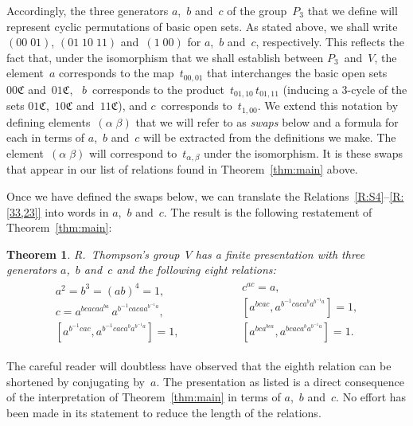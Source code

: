 \documentclass[a4paper,11pt]{article}
\numberwithin{equation}{section}
\newcommand{\C}{\mathfrak{C}}
\newcommand{\nbd}{\nobreakdash-}
\newcommand{\swap}[2]{(#1\;#2)}
\newtheorem{thm}{Theorem}[section]
\begin{document}
Accordingly, the three generators $a$,~$b$ and~$c$ of the
group~$P_{3}$ that we define will represent cyclic permutations of
basic open sets.  As stated above, we shall write $\swap{00}{01}$,
$(01 \; 10 \; 11)$ and~$\swap{1}{00}$ for $a$,~$b$ and~$c$,
respectively.  This reflects the fact that, under the isomorphism that
we shall establish between $P_{3}$~and~$V$, the element~$a$
corresponds to the map~$t_{00,01}$ that interchanges the basic open
sets $00\C$ and~$01\C$, \ $b$~corresponds to the product~$t_{01,10}\,
t_{01,11}$ (inducing a $3$\nbd cycle of the sets $01\C$,~$10\C$
and~$11\C$), and $c$~corresponds to~$t_{1,00}$.  We extend this
notation by defining elements~$\swap{\alpha}{\beta}$ that we will
refer to as \emph{swaps} below and a formula for each in terms of
$a$,~$b$ and~$c$ will be extracted from the definitions we make.  The
element~$\swap{\alpha}{\beta}$ will correspond to~$t_{\alpha,\beta}$
under the isomorphism.  It is these swaps that appear in our list of
relations found in Theorem~\ref{thm:main} above.

Once we have defined the swaps below, we can translate the
Relations~\ref{R:S4}--\ref{R:[33,23]} into words in $a$,~$b$ and~$c$.
The result is the following restatement of Theorem~\ref{thm:main}:

\begin{thm}
  \label{thm:mainWithWords}
  R.~Thompson's group~$V$ has a finite presentation with three
  generators $a$,~$b$ and~$c$ and the following eight relations:
\begin{equation}
  \begin{aligned}
    \begin{gathered}
      a^{2} = b^{3} = (ab)^{4} = 1, \\
      c = a^{bcacaa^{ba}} \, a^{b^{-1}cacaa^{b^{-1}a}}, \\
      [ a^{b^{-1}cac} , a^{b^{-1}caca^{b}a^{b^{-1}a}} ] = 1,
    \end{gathered}
    \qquad\qquad
    &\begin{gathered}
       c^{ac} = a, \\
       [ a^{bcac} , a^{b^{-1}caca^{b}a^{b^{-1}a}} ] = 1, \\
       [ a^{bca^{bca}} , a^{bcaca^{b}a^{b^{-1}a}} ] = 1.
     \end{gathered}
  \end{aligned}
  \label{eq:R-words}
\end{equation}
\end{thm}

The careful reader will doubtless have observed that the eighth
relation can be shortened by conjugating by~$a$.  The presentation as
listed is a direct consequence of the interpretation of
Theorem~\ref{thm:main} in terms of $a$,~$b$ and~$c$.  No effort has
been made in its statement to reduce the length of the relations.
\end{document}
